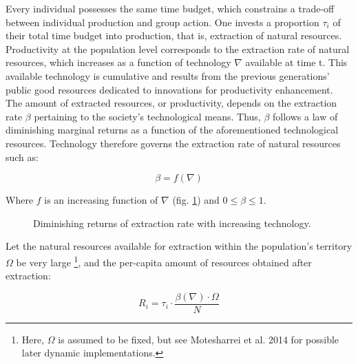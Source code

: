 \documentclass[a4paper]{article}
\begin{document}
Every individual possesses the same time budget, which constrains a trade-off between individual production and group action. One invests a proportion $\tau_i$ of their total time budget into production, that is, extraction of natural resources. Productivity at the population level corresponds to the extraction rate of natural resources, which increases as a function of technology $\nabla$ available at time t. This available technology is cumulative and results from the previous generations' public good resources dedicated to innovations for productivity enhancement. The amount of extracted resources, or productivity, depends on the extraction rate $\beta$ pertaining to the society's technological means. Thus, $\beta$ follows a law of diminishing marginal returns as a function of the aforementioned technological resources. Technology therefore governs the extraction rate of natural resources such as:

\begin{equation}
\beta = f\left(\nabla\right)
\end{equation}
 
Where $f$ is an increasing function of $\nabla$ (fig. \ref{fig:betafunc}) and $0\le\beta\le1$.

\begin{figure}[!htbp]
	\begin{center}
	\end{center}
	\caption{Diminishing returns of extraction rate with increasing technology.}
	\label{fig:betafunc}
\end{figure} 

Let the natural resources available for extraction within the population's territory $\Omega$ be very large \footnote{Here, $\Omega$ is assumed to be fixed, but see Motesharrei et al. 2014 for possible later dynamic implementations.}, and the per-capita amount of resources obtained after extraction:

\begin{equation} \label{eq:resources}
	R_i = \tau_i\cdot\frac{\beta\left(\nabla\right)\cdot\Omega}{N}
\end{equation}
\end{document}
